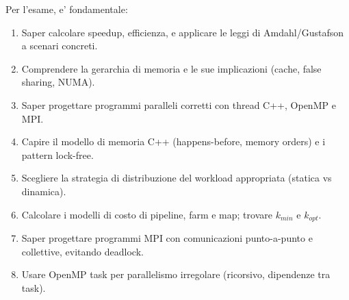 \documentclass[11pt,a4paper]{article}
\theoremstyle{remark}
\begin{document}
Per l'esame, e' fondamentale:
\begin{enumerate}
  \item Saper calcolare speedup, efficienza, e applicare le leggi di Amdahl/Gustafson a scenari concreti.
  \item Comprendere la gerarchia di memoria e le sue implicazioni (cache, false sharing, NUMA).
  \item Saper progettare programmi paralleli corretti con thread C++, OpenMP e MPI.
  \item Capire il modello di memoria C++ (happens-before, memory orders) e i pattern lock-free.
  \item Scegliere la strategia di distribuzione del workload appropriata (statica vs dinamica).
  \item Calcolare i modelli di costo di pipeline, farm e map; trovare $k_{min}$ e $k_{opt}$.
  \item Saper progettare programmi MPI con comunicazioni punto-a-punto e collettive, evitando deadlock.
  \item Usare OpenMP task per parallelismo irregolare (ricorsivo, dipendenze tra task).
\end{enumerate}
\end{document}
